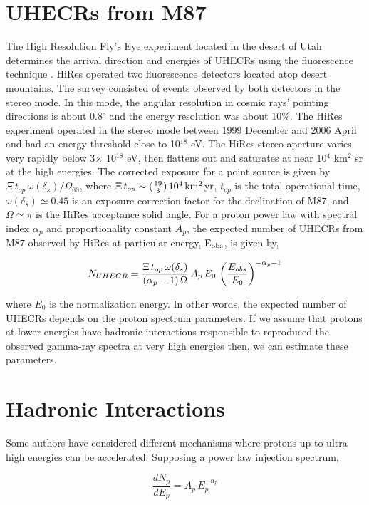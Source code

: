 \documentclass[preprint, twocolumn,secnumarabic,amssymb, nobibnotes, aps, prd]{revtex4-1}
\newcommand{\be}{\begin{equation}}
\newcommand{\ee}{\end{equation}}
\newcommand{\bary}{\begin{eqnarray}}
\newcommand{\eary}{\end{eqnarray}}
\begin{document}
\section{UHECRs from M87}

The High Resolution Fly's Eye experiment located in the desert of Utah determines the arrival direction and energies of  UHECRs  using  the fluorescence technique \citep{abb07,abb10}.  HiRes operated   two fluorescence detectors located atop desert mountains. The survey consisted of events observed by both detectors in the stereo mode. In this mode, the angular resolution in cosmic rays'  pointing directions is about 0.8$^\circ$ and the energy resolution was about 10\%.  The HiRes experiment operated in the stereo mode between 1999 December and 2006 April and had an energy threshold close to 10$^{18}$ eV.
The HiRes stereo aperture varies very rapidly below 3$\times$ 10$^{18}$ eV, then flattens out and saturates at near 10$^4$ km$^2$ sr at the high energies.  The corrected exposure for a point source is given by $\Xi\,t_{op}\, \omega(\delta_s)/\Omega_{60}$, where $\Xi\,t_{op}\sim(\frac{19}{3})\,10^4\,\rm km^2\,yr$, $t_{op} $ is the total operational time,  $\omega(\delta_s)\simeq 0.45$ is an exposure correction factor for the declination of M87, and $\Omega \simeq\pi$ is the HiRes acceptance solid angle. For a proton power law with spectral index $\alpha_p$ and proportionality constant $A_p$, the expected number of UHECRs from M87 observed by HiRes at particular energy, $\rm E_{obs}$, is given by,

\bary
N_{\tiny UHECR}=\frac{\Xi\,t_{op}\, \omega(\delta_s)}{(\alpha_p-1)\,\Omega}\,A_p\,E_0\,\left(\frac{E_{obs}}{E_0}\right)^{-\alpha_p+1}
\eary

\noindent where $E_0$ is the normalization energy. In other words, the expected number of UHECRs  depends on the proton spectrum parameters. If we assume that protons at lower energies have hadronic interactions responsible to reproduced the observed gamma-ray spectra at very high energies then, we can estimate these parameters.


\section{Hadronic Interactions}

Some authors \citep{oli00,bha00,sta04} have considered different mechanisms where protons up to ultra high energies can be accelerated. Supposing a power law injection spectrum,

\be\label{spepr}
\frac{dN_p}{dE_p}=A_p\,E_p^{-\alpha_p}
\ee
\end{document}
